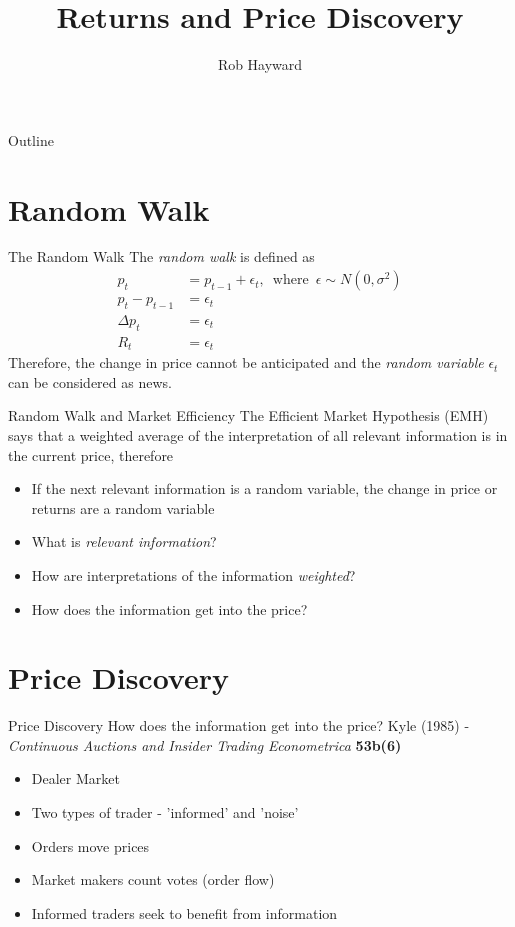 \documentclass[14pt,xcolor=pdftex,dvipsnames,table]{beamer}
\title{Returns and Price Discovery}
\author{Rob Hayward}
\begin{document}
\begin{frame}
\titlepage
\end{frame}

\begin{frame}{Outline}
\tableofcontents
\end{frame}

\section{Random Walk}
\begin{frame}{The Random Walk}
The \emph{random walk} is defined as 
\begin{align*}
p_t &= p_{t-1} + \epsilon_t,  \hspace{6pt} \text{where} \hspace{6pt}  \epsilon \sim N(0, \sigma^2)\\
p_t - p_{t-1} &= \epsilon_t\\
\Delta p_t &= \epsilon_t\\
R_t &= \epsilon_t
\end{align*}
Therefore, the change in price cannot be anticipated and the \emph{random variable} $\epsilon_t$ can be considered as news. 
\end{frame}

\begin{frame}{Random Walk and Market Efficiency}
The Efficient Market Hypothesis (EMH) says that a weighted average of the interpretation of all relevant information is in the current price, therefore
\pause
\begin{itemize}[<+-| alert@+>]
\item If the next relevant information is a random variable, the change in price or returns are a random variable
\item What is \emph{relevant information}? 
\item How are interpretations of the information \emph{weighted}? 
\item How does the information get into the price? 
\end{itemize}
\end{frame}

\section{Price Discovery}
\begin{frame}{Price Discovery}
How does the information get into the price? 
\pause
Kyle (1985) - \emph{Continuous Auctions and Insider Trading} \emph{Econometrica} \textbf{53b(6)}
\begin{itemize}[<+-| alert@+>]
\item Dealer Market
\item Two types of trader - 'informed' and 'noise'
\item Orders move prices
\item Market makers count votes (order flow)
\item Informed traders seek to benefit from information
\end{itemize}
\end{frame}
\end{document}
